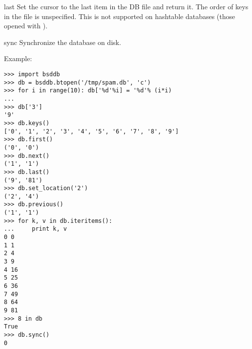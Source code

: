 \begin{methoddesc}{last}{}
Set the cursor to the last item in the DB file and return it.  The
order of keys in the file is unspecified.  This is not supported on
hashtable databases (those opened with ).
\end{methoddesc}

\begin{methoddesc}{sync}{}
Synchronize the database on disk.
\end{methoddesc}

Example:

\begin{verbatim}
>>> import bsddb
>>> db = bsddb.btopen('/tmp/spam.db', 'c')
>>> for i in range(10): db['%d'%i] = '%d'% (i*i)
... 
>>> db['3']
'9'
>>> db.keys()
['0', '1', '2', '3', '4', '5', '6', '7', '8', '9']
>>> db.first()
('0', '0')
>>> db.next()
('1', '1')
>>> db.last()
('9', '81')
>>> db.set_location('2')
('2', '4')
>>> db.previous() 
('1', '1')
>>> for k, v in db.iteritems():
...     print k, v
0 0
1 1
2 4
3 9
4 16
5 25
6 36
7 49
8 64
9 81
>>> 8 in db
True
>>> db.sync()
0
\end{verbatim}
